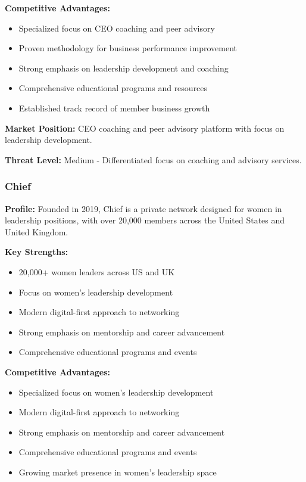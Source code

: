 \textbf{Competitive Advantages:}
\begin{itemize}
    \item Specialized focus on CEO coaching and peer advisory
    \item Proven methodology for business performance improvement
    \item Strong emphasis on leadership development and coaching
    \item Comprehensive educational programs and resources
    \item Established track record of member business growth
\end{itemize}

\textbf{Market Position:} CEO coaching and peer advisory platform with focus on leadership development.

\textbf{Threat Level:} Medium - Differentiated focus on coaching and advisory services.

\subsubsection{Chief}
\textbf{Profile:} Founded in 2019, Chief is a private network designed for women in leadership positions, with over 20,000 members across the United States and United Kingdom.

\textbf{Key Strengths:}
\begin{itemize}
    \item 20,000+ women leaders across US and UK
    \item Focus on women's leadership development
    \item Modern digital-first approach to networking
    \item Strong emphasis on mentorship and career advancement
    \item Comprehensive educational programs and events
\end{itemize}

\textbf{Competitive Advantages:}
\begin{itemize}
    \item Specialized focus on women's leadership development
    \item Modern digital-first approach to networking
    \item Strong emphasis on mentorship and career advancement
    \item Comprehensive educational programs and events
    \item Growing market presence in women's leadership space
\end{itemize}

